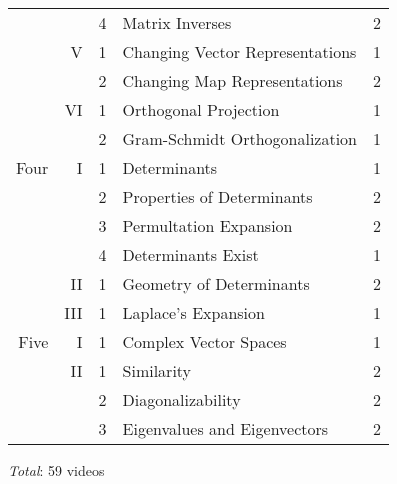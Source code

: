 \documentclass{article}
\begin{document}
\begin{center}
\begin{tabular}{|rrc|lc|}
      &    &4 &Matrix Inverses                    &2   \\
      \cline{4-5}
      &V   &1 &Changing Vector Representations    &1   \\
      &    &2 &Changing Map Representations       &2   \\
      \cline{4-5}
      &VI  &1 &Orthogonal Projection              &1   \\
      &    &2 &Gram-Schmidt Orthogonalization     &1   \\
  \hline
 Four &I   &1 &Determinants                       &1   \\
      &    &2 &Properties of Determinants         &2   \\
      &    &3 &Permultation Expansion             &2   \\
      &    &4 &Determinants Exist                 &1   \\
      \cline{4-5}
      &II  &1 &Geometry of Determinants           &2   \\
      \cline{4-5}
      &III &1 &Laplace's Expansion                &1   \\
 \hline
 Five &I   &1 &Complex Vector Spaces              &1   \\
      \cline{4-5}
      &II  &1 &Similarity                         &2   \\
      &    &2 &Diagonalizability                  &2   \\
      &    &3 &Eigenvalues and Eigenvectors       &2   \\
 \hline
\end{tabular}
\end{center}
\vspace{1ex}
\textit{Total}: 59 videos
\end{document}
